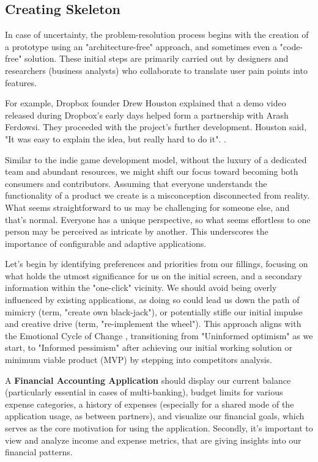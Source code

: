 
\subsection{Creating Skeleton}

In case of uncertainty, the problem-resolution process begins with the creation of a prototype using an 
"architecture-free" approach, and sometimes even a "code-free" solution. These initial steps are primarily carried out 
by designers and researchers (business analysts) who collaborate to translate user pain points into features.

For example, Dropbox founder Drew Houston explained that a demo video released during Dropbox's early days helped form 
a partnership with Arash Ferdowsi. They proceeded with the project's further development. Houston said, "It was easy to 
explain the idea, but really hard to do it". \cite{Shon13}.

Similar to the indie game development model, without the luxury of a dedicated team and abundant resources, we might 
shift our focus toward becoming both consumers and contributors. Assuming that everyone understands the functionality of 
a product we create is a misconception disconnected from reality. What seems straightforward to us may be challenging 
for someone else, and that's normal. Everyone has a unique perspective, so what seems effortless to one person may be 
perceived as intricate by another. This underscores the importance of configurable and adaptive applications.

Let's begin by identifying preferences and priorities from our fillings, focusing on what holds the utmost significance 
for us on the initial screen, and a secondary information within the "one-click" vicinity. We should avoid being overly 
influenced by existing applications, as doing so could lead us down the path of mimicry (term, "create own black-jack"), 
or potentially stifle our initial impulse and creative drive (term, "re-implement the wheel"). This approach aligns 
with the Emotional Cycle of Change \cite{Pfei79}, transitioning from "Uninformed optimism" as we start, to 
"Informed pessimism" after achieving our initial working solution or minimum viable product (MVP) by stepping into 
competitors analysis.

A \textbf{Financial Accounting Application} should display our current balance (particularly essential in cases of 
multi-banking), budget limits for various expense categories, a history of expenses (especially for a shared mode of 
the application usage, as between partners), and visualize our financial goals, which serves as the core motivation for 
using the application. Secondly, it's important to view and analyze income and expense metrics, that are giving insights 
into our financial patterns. 

